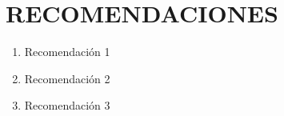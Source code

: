 \cleardoublepage{}
\chapter*{RECOMENDACIONES}
%
\begin{enumerate}

    \item Recomendación 1

    \item Recomendación 2

    \item Recomendación 3

\end{enumerate}